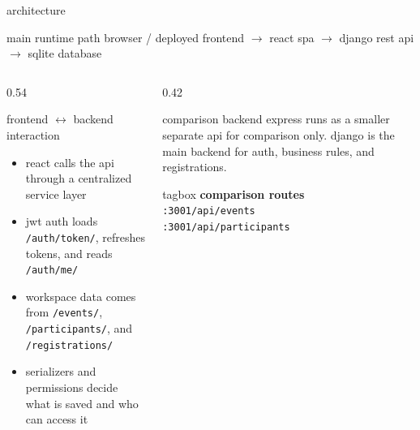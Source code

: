 \documentclass[aspectratio=169,11pt]{beamer}
\begin{document}
\begin{frame}{architecture}
  \begin{block}{main runtime path}
    browser / deployed frontend $\rightarrow$ react spa $\rightarrow$ django rest api $\rightarrow$ sqlite database
  \end{block}

  \begin{columns}[T]
    \begin{column}{0.54\textwidth}
      \begin{exampleblock}{frontend $\leftrightarrow$ backend interaction}
        \begin{itemize}
          \item react calls the api through a centralized service layer
          \item jwt auth loads \texttt{/auth/token/}, refreshes tokens, and reads \texttt{/auth/me/}
          \item workspace data comes from \texttt{/events/}, \texttt{/participants/}, and \texttt{/registrations/}
          \item serializers and permissions decide what is saved and who can access it
        \end{itemize}
      \end{exampleblock}
    \end{column}
    \begin{column}{0.42\textwidth}
      \begin{alertblock}{comparison backend}
        express runs as a smaller separate api for comparison only.
        django is the main backend for auth, business rules, and registrations.
      \end{alertblock}

      \begin{beamercolorbox}[wd=\linewidth,sep=0.7em]{tagbox}
        \textbf{comparison routes}\\[0.25em]
        \texttt{:3001/api/events}\\
        \texttt{:3001/api/participants}
      \end{beamercolorbox}
    \end{column}
  \end{columns}
\end{frame}
\end{document}

